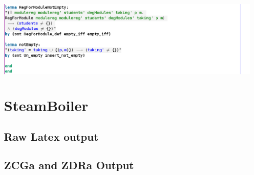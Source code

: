 \noindent \includegraphics[scale=0.5]{examples/modulereg/6imagef.png}

\section{SteamBoiler}
\label{app:steamboiler}



\subsection{Raw Latex output}
\label{app:sb0o}



\subsection{ZCGa and ZDRa Output}
\label{app:sb1n2o}

